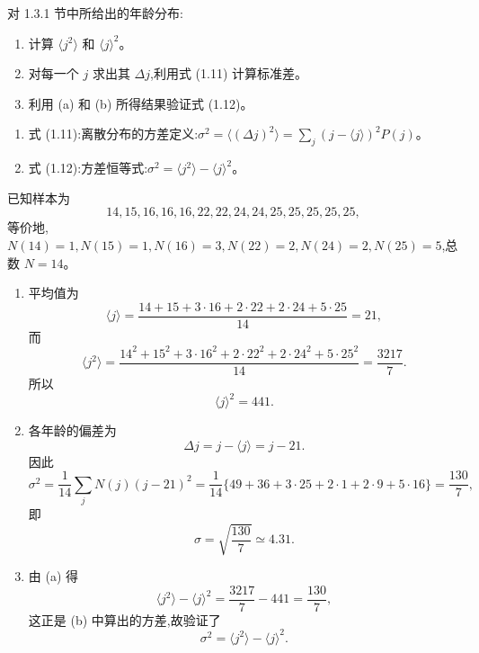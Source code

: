 \begin{question}
对 1.3.1 节中所给出的年龄分布:
\begin{enumerate}
\item 计算 $\langle j^2\rangle$ 和 $\langle j\rangle^2$。
\item 对每一个 $j$ 求出其 $\Delta j$,利用式 (1.11) 计算标准差。
\item 利用 (a) 和 (b) 所得结果验证式 (1.12)。
\end{enumerate}

\par\smallskip
{}
\begin{enumerate}[leftmargin=2.2em,itemsep=0.12em,topsep=0.12em,parsep=0pt]
\item 式 (1.11):离散分布的方差定义:$\sigma^2=\langle(\Delta j)^2\rangle=\sum_j (j-\langle j\rangle)^2P(j)$。
\item 式 (1.12):方差恒等式:$\sigma^2=\langle j^2\rangle-\langle j\rangle^2$。
\end{enumerate}

\begin{solution}
已知样本为
\[
14,15,16,16,16,22,22,24,24,25,25,25,25,25,
\]
等价地,$N(14)=1,N(15)=1,N(16)=3,N(22)=2,N(24)=2,N(25)=5$,总数 $N=14$。
\begin{enumerate}
\item 平均值为
\[
\langle j\rangle=\frac{14+15+3\cdot 16+2\cdot 22+2\cdot 24+5\cdot 25}{14}=21,
\]
而
\[
\langle j^2\rangle=\frac{14^2+15^2+3\cdot 16^2+2\cdot 22^2+2\cdot 24^2+5\cdot 25^2}{14}
=\frac{3217}{7}.
\]
所以
\[
\langle j\rangle^2=441.
\]
\item 各年龄的偏差为
\[
\Delta j=j-\langle j\rangle=j-21.
\]
因此
\[
\sigma^2=\frac{1}{14}\sum_j N(j)(j-21)^2
=\frac{1}{14}\{49+36+3\cdot25+2\cdot1+2\cdot9+5\cdot16\}
=\frac{130}{7},
\]
即
\[
\sigma=\sqrt{\frac{130}{7}}\simeq 4.31.
\]
\item 由 (a) 得
\[
\langle j^2\rangle-\langle j\rangle^2=\frac{3217}{7}-441=\frac{130}{7},
\]
这正是 (b) 中算出的方差,故验证了
\[
\sigma^2=\langle j^2\rangle-\langle j\rangle^2.
\]
\end{enumerate}
\end{solution}
\end{question}

